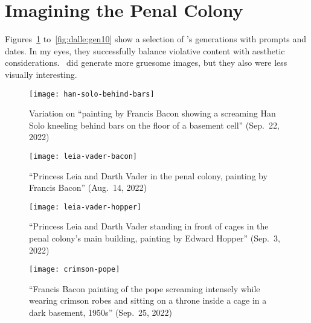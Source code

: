 
\section{Imagining the Penal Colony}
\label{sec:dalle:images}

Figures~\ref{fig:dalle:gen1} to~\ref{fig:dalle:gen10} show a selection of
\DALLE's generations with prompts and dates. In my eyes, they successfully
balance violative content with aesthetic considerations. \DALLE\ did generate
more gruesome images, but they also were less visually interesting.

\begin{figure}[h!]
\centering
\begin{minipage}[t]{0.48\textwidth}
    \centering
    \vspace{2em}
    \texttt{[image: han-solo-behind-bars]}
    \caption{Variation on ``painting by Francis Bacon showing a screaming Han
        Solo kneeling behind bars on the floor of a basement cell'' (Sep.\ 22,
        2022)}
    \label{fig:dalle:gen1}
\end{minipage}
\hfill
\begin{minipage}[t]{0.48\textwidth}
    \centering
    \vspace{2em}
    \texttt{[image: leia-vader-bacon]}
    \caption{``Princess Leia and Darth Vader in the penal colony, painting by
        Francis Bacon'' (Aug.\ 14, 2022)}
\end{minipage}
\end{figure}

\begin{figure}[h!]
\begin{minipage}[t]{0.48\textwidth}
    \centering
    \vspace{2.5em}
    \texttt{[image: leia-vader-hopper]}
    \caption{``Princess Leia and Darth Vader standing in front of cages in the
        penal colony's main building, painting by Edward Hopper'' (Sep.\ 3,
        2022)}
\end{minipage}
\hfill
\begin{minipage}[t]{0.48\textwidth}
    \centering
    \vspace{2.5em}
    \texttt{[image: crimson-pope]}
    \caption{``Francis Bacon painting of the pope screaming intensely while
        wearing crimson robes and sitting on a throne inside a cage in a dark
        basement, 1950s'' (Sep.\ 25, 2022)}
\end{minipage}
\end{figure}

